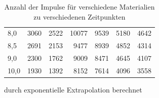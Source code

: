 \documentclass[12pt,german]{article}
\begin{document}
\begin{table}[H]
\begin{threeparttable}
\begin{tabularx}{\textwidth}{L|R|R|R|R|R|R}
            8,0 & 3060  & 2522  & 10077 & 9539  & 5180  & 4642    \\
            8,5 & 2691  & 2153  & 9477  & 8939  & 4852  & 4314    \\
            9,0 & 2300  & 1762  & 9009  & 8471  & 4645  & 4107    \\
            10,0 & 1930 & 1392  & 8152  & 7614   & 4096  & 3558   \\
            \bottomrule
        \end{tabularx}
        \begin{tablenotes}
            \small
            \item * durch exponentielle Extrapolation berechnet
        \end{tablenotes}
        \caption{Anzahl der Impulse für verschiedene Materialien zu verschiedenen Zeitpunkten}
    \end{threeparttable}
    \end{table}
\end{document}
